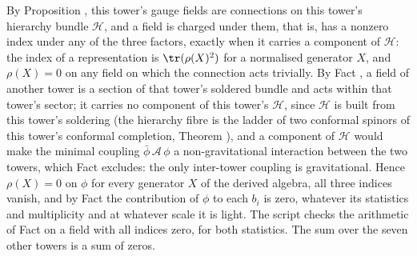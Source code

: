 By Proposition , this tower's gauge fields are connections on this tower's hierarchy bundle $\mathcal{H}$, and a field is charged under them, that is, has a nonzero index under any of the three factors, exactly when it carries a component of $\mathcal{H}$: the index of a representation is $\tr(\rho(X)^{2})$ for a normalised generator $X$, and $\rho(X) = 0$ on any field on which the connection acts trivially. By Fact , a field of another tower is a section of that tower's soldered bundle and acts within that tower's sector; it carries no component of this tower's $\mathcal{H}$, since $\mathcal{H}$ is built from this tower's soldering (the hierarchy fibre is the ladder of two conformal spinors of this tower's conformal completion, Theorem ), and a component of $\mathcal{H}$ would make the minimal coupling $\bar{\phi}\,\mathcal{A}\,\phi$ a non-gravitational interaction between the two towers, which Fact  excludes: the only inter-tower coupling is gravitational. Hence $\rho(X) = 0$ on $\phi$ for every generator $X$ of the derived algebra, all three indices vanish, and by Fact  the contribution of $\phi$ to each $b_{i}$ is zero, whatever its statistics and multiplicity and at whatever scale it is light. The script checks the arithmetic of Fact  on a field with all indices zero, for both statistics. The sum over the seven other towers is a sum of zeros.
